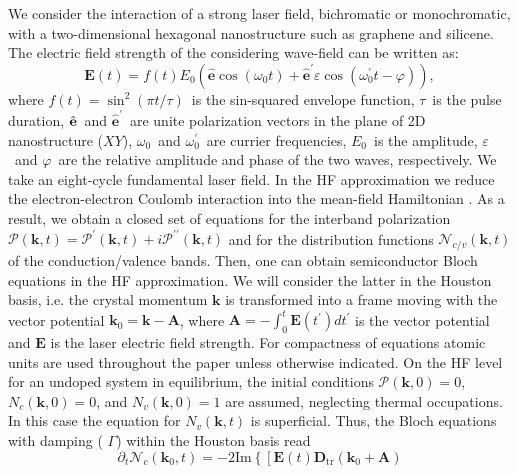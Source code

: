 \documentclass[reprint, superscriptaddress,  aps, pra]{revtex4-2}
\begin{document}
We consider the interaction of a strong laser field, bichromatic or
monochromatic, with a two-dimensional hexagonal nanostructure such as
graphene and silicene. The electric field strength of the considering
wave-field can be written as: 
\begin{equation}
\mathbf{E}\left( t\right) =f\left( t\right) E_{0}\left( \hat{\mathbf{e}}\cos
\left( \omega _{0}t\right) +\hat{\mathbf{e}}^{\prime }\varepsilon \cos
\left( \omega _{0}^{\prime }t-\varphi \right) \right) ,  \label{field}
\end{equation}
where $f\left( t\right) =\sin ^{2}\left( \pi t/\tau \right) $\ is the
sin-squared envelope function, $\tau $\ is the pulse duration, $\hat{\mathbf{%
e}}$\ and $\hat{\mathbf{e}}^{\prime }$\ are unite polarization vectors in
the plane of 2D nanostructure ($XY$), $\omega _{0}$\ and $\omega
_{0}^{\prime }$\ are currier frequencies, $E_{0}$\ is the amplitude, $%
\varepsilon $\ and $\varphi $\ are the relative amplitude and phase of the
two waves, respectively. We take an eight-cycle fundamental laser field. In
the HF approximation we reduce the electron-electron Coulomb interaction
into the mean-field Hamiltonian \cite{Mer18}. As a result, we obtain a
closed set of equations for the interband polarization $\mathcal{P}(\mathbf{k%
},t)=\mathcal{P}^{\prime }(\mathbf{k},t)+i\mathcal{P}^{\prime \prime }(%
\mathbf{k},t)$ and for the distribution functions $\mathcal{N}_{c/v}\left( 
\mathbf{k},t\right) $ of the conduction/valence bands. Then, one can obtain
semiconductor Bloch equations in the HF approximation. We will consider the
latter in the Houston basis, i.e. the crystal momentum $\mathbf{k}$ is
transformed into a frame moving with the vector potential $\mathbf{k}_{0}=%
\mathbf{k}-\mathbf{A}$, where $\mathbf{A=-}\int_{0}^{t}\mathbf{E}\left(
t^{\prime }\right) dt^{\prime }$ is the vector potential and $\mathbf{E}$ is
the laser electric field strength. For compactness of equations atomic units
are used throughout the paper unless otherwise indicated. On the HF level
for an undoped system in equilibrium, the initial conditions $\mathcal{P}(%
\mathbf{k},0)=0$, $N_{c}(\mathbf{k},0)=0$, and $N_{v}(\mathbf{k},0)=1$ are
assumed, neglecting thermal occupations. In this case the equation for $%
N_{v}(\mathbf{k},t)$ is superficial. Thus, the Bloch equations with damping (%
$\Gamma $) within the Houston basis read 
\begin{equation*}
\partial _{t}\mathcal{N}_{c}(\mathbf{k}_{0},t)=-2\mathrm{Im}\left\{ \left[ 
\mathbf{E}\left( t\right) \mathbf{D}_{\mathrm{tr}}\left( \mathbf{k}_{0}+%
\mathbf{A}\right) \right. \right.
\end{equation*}%
\end{document}
